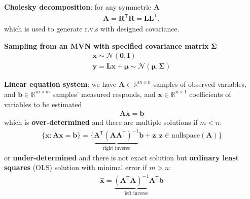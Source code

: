 \textbf{Cholesky decomposition}: for any symmetric $\mathbf{A}$
\begin{gather}
    \mathbf{A}=\mathbf{R}^\mathsf{T}\mathbf{R}=\mathbf{LL}^\mathsf{T},
\end{gather}
which is used to generate r.v.s with designed covariance.

\begin{example}
    \textbf{Sampling from an MVN with specified covariance matrix} $\mathbf{\Sigma}$\\
    \begin{gather}
        \bm{x}\sim\mathcal{N}(\mathbf{0},\mathbf{I})\\
        \bm{y}=\mathbf{L}\bm{x}+\bm{\mu}\sim\mathcal{N}(\bm{\mu},\mathbf{\Sigma})
    \end{gather}
\end{example}

\textbf{Linear equation system}: 
we have $\mathbf{A}\in\mathbb{R}^{m\times n}$ samples of observed variables, 
and $\bm{b}\in\mathbb{R}^{m\times m}$ samples' measured responds, and 
$\bm{x}\in\mathbb{R}^{n\times 1}$ coefficients of variables to be estimated
\begin{gather}
    \mathbf{A}\bm{x}=\bm{b}
\end{gather}
which is \textbf{over-determined} and there are multiple solutions if $m<n$:
\begin{gather}
    \{\bm{x}: \mathbf{A}\bm{x}=\bm{b}\}
    = \{\underbrace{\mathbf{A}^\mathsf{T}(\mathbf{AA}^\mathsf{T})^{-1}}_{\text{right inverse}}\bm{b}+\bm{z}:\bm{z}\in\mathrm{nullspace}(\mathbf{A})\}
\end{gather}
or \textbf{under-determined} and there is not exact solution but \textbf{ordinary least squares} (OLS) solution with minimal error if $m>n$:
\begin{gather}
    \hat{\bm{x}} = \underbrace{(\mathbf{A}^\mathsf{T}\mathbf{A})^{-1}\mathbf{A}^\mathsf{T}}_{\text{left inverse}}\bm{b}
\end{gather}

